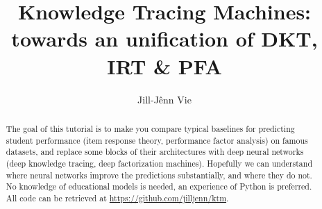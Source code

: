 \documentclass[runningheads]{llncs}
\begin{document}
%
\title{Knowledge Tracing Machines: towards an unification of DKT, IRT \& PFA}
%
%
\author{Jill-Jênn Vie}
%
%
%
\maketitle              %
%
\begin{abstract}
The goal of this tutorial is to make you compare typical baselines for predicting student performance (item response theory, performance factor analysis) on famous datasets, and replace some blocks of their architectures with deep neural networks (deep knowledge tracing, deep factorization machines). Hopefully we can understand where neural networks improve the predictions substantially, and where they do not. No knowledge of educational models is needed, an experience of Python is preferred. All code can be retrieved at \url{https://github.com/jilljenn/ktm}.

\end{abstract}
%
%
%
\end{document}
